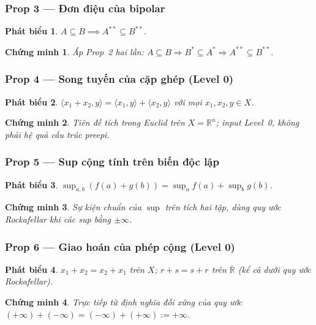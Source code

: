 \documentclass[11pt]{article}
\theoremstyle{plainlabel}
\newtheorem*{phatbieu}{Phát biểu}
\newtheorem*{chungminh}{Chứng minh}
\begin{document}
\subsubsection*{Prop 3 --- Đơn điệu của bipolar}
\begin{phatbieu} $A\subseteq B\implies A^{**}\subseteq B^{**}$. \end{phatbieu}
\begin{chungminh} Áp Prop~2 hai lần: $A\subseteq B\Rightarrow B^*\subseteq A^*\Rightarrow A^{**}\subseteq B^{**}$. \end{chungminh}

\subsubsection*{Prop 4 --- Song tuyến của cặp ghép (Level 0)}
\begin{phatbieu} $\langle x_1+x_2,y\rangle=\langle x_1,y\rangle+\langle x_2,y\rangle$ với mọi $x_1,x_2,y\in X$. \end{phatbieu}
\begin{chungminh} Tiên đề tích trong Euclid trên $X=\mathbb R^n$; input Level~0, không phải hệ quả cấu trúc preepi. \end{chungminh}

\subsubsection*{Prop 5 --- Sup cộng tính trên biến độc lập}
\begin{phatbieu} $\displaystyle\sup_{a,b}(f(a)+g(b))=\sup_a f(a)+\sup_b g(b)$. \end{phatbieu}
\begin{chungminh} Sự kiện chuẩn của $\sup$ trên tích hai tập, dùng quy ước Rockafellar khi các sup bằng $\pm\infty$. \end{chungminh}

\subsubsection*{Prop 6 --- Giao hoán của phép cộng (Level 0)}
\begin{phatbieu} $x_1+x_2=x_2+x_1$ trên $X$; $r+s=s+r$ trên $\overline{\mathbb R}$ (kể cả dưới quy ước Rockafellar). \end{phatbieu}
\begin{chungminh} Trực tiếp từ định nghĩa đối xứng của quy ước $(+\infty)+(-\infty)=(-\infty)+(+\infty):=+\infty$. \end{chungminh}
\end{document}
